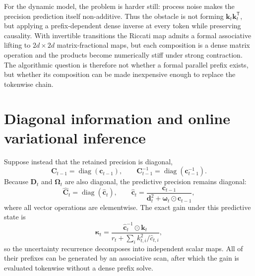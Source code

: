 \documentclass[11pt]{article}
\newcommand{\vct}[1]{\boldsymbol{#1}}
\newcommand{\tr}{\mathsf{T}}
\DeclareMathOperator{\diag}{diag}
\begin{document}
For the dynamic model, the problem is harder still: process noise makes the
precision prediction itself non-additive.  Thus the obstacle is not forming
$\vct{k}_t\vct{k}_t^{\tr}$, but applying a prefix-dependent dense inverse at
every token while preserving causality.  With invertible transitions the
Riccati map admits a formal associative lifting to $2d\times2d$
matrix-fractional maps, but each composition is a dense matrix operation and
the products become numerically stiff under strong contraction.  The
algorithmic question is therefore not whether a formal parallel prefix exists,
but whether its composition can be made inexpensive enough to replace the
tokenwise chain.

\section{Diagonal information and online variational inference}

Suppose instead that the retained precision is diagonal,
\begin{equation}
  \vct{C}_{t-1}=\diag(\vct{c}_{t-1}),
  \qquad
  \vct{C}_{t-1}^{-1}
  =\diag(\vct{c}_{t-1}^{-1}).
\end{equation}
Because $\vct{D}_t$ and $\vct{\Omega}_t$ are also diagonal, the predictive
precision remains diagonal:
\begin{equation}
  \widehat{\vct{C}}_t=\diag(\widehat{\vct{c}}_t),
  \qquad
  \widehat{\vct{c}}_t
  =\frac{\vct{c}_{t-1}}
  {\vct{d}_t^2+\vct{\omega}_t\odot\vct{c}_{t-1}},
  \label{eq:diagonal-information-prediction}
\end{equation}
where all vector operations are elementwise.  The exact gain under this
predictive state is
\begin{equation}
  \vct{\kappa}_t
  =\frac{\widehat{\vct{c}}_t^{-1}\odot\vct{k}_t}
  {r_t+\sum_i k_{t,i}^2/\widehat c_{t,i}},
  \label{eq:diagonal-information-gain}
\end{equation}
so the uncertainty recurrence decomposes into independent scalar maps.  All
of their prefixes can be generated by an associative scan, after which the
gain is evaluated tokenwise without a dense prefix solve.
\end{document}
